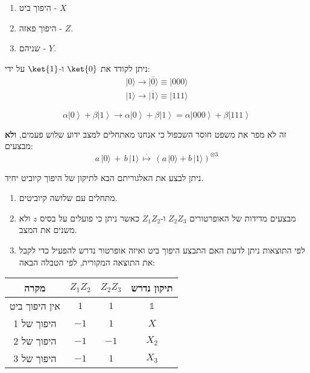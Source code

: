 \documentclass{tstextbook}
\begin{document}
\begin{proposition}
  \begin{enumerate}
    \item היפוך ביט - \(X\)


    \item היפוך פאזה - \(Z\). 


    \item שניהם - \(Y\). 


  \end{enumerate}
\end{proposition}
\begin{lemma}
ניתן לקודד את \(\ket{0}\) ו-\(\ket{1}\) על ידי:
$$\begin{array}{r}{|0\rangle\longrightarrow|\overline{{{0}}}\rangle\equiv|000\rangle}\\ {|1\rangle\longrightarrow|\overline{{{1}}}\rangle\equiv|111\rangle}\end{array}$$

\end{lemma}
\begin{corollary}
$$\alpha\left|0\right\rangle+\beta\left|1\right\rangle\longrightarrow\alpha\left|0\right\rangle+\beta\left|1\right\rangle=\alpha\left|000\right\rangle+\beta\left|111\right\rangle$$

\end{corollary}
\begin{remark}
זה לא מפר את משפט חוסר השכפול כי אנחנו מאתחלים למצב ידוע שלוש פעמים, \textbf{ולא} מבצעים:
$$a\,|0\rangle\,+\,b\,|1\rangle\,\stackrel{.}{\mapsto}\,\left(a\,|0\rangle+b\,|1\rangle\right)^{\otimes3}$$

\end{remark}
\begin{proposition}
ניתן לבצע את האלגוריתם הבא לתיקון של היפוך קיוביט יחיד.

  \begin{enumerate}
    \item מתחלים עם שלושה קיוביטים. 


    \item מבצעים מדידות של האופרטורים \(Z_{2}Z_{3}\) ו-\(Z_{1}Z_{2}\) כאשר ניתן כי פועלים על בסיס \(z\) ולא משנים את המצב. 


    \item לפי התוצאות ניתן לדעת האם התבצע היפוך ביט ואיזה אופרטור נדרש להפעיל כדי לקבל את התוצאה המקורית, לפי הטבלה הבאה: 


  \end{enumerate}
  \begin{table}[htbp]
    \centering
    \begin{tabular}{|cccc|}
      \hline
      מקרה & \(Z_1 Z_2\) & \(Z_2 Z_3\) & תיקון נדרש \\ \hline
      אין היפוך ביט & \(1\) & \(1\) & \(\mathbb{1}\) \\ \hline
      היפוך של 1 & \(-1\) & \(1\) & \(X\) \\ \hline
      היפוך של 2 & \(-1\) & \(-1\) & \(X_2\) \\ \hline
      היפוך של 3 & \(-1\) & \(1\) & \(X_3\) \\ \hline
    \end{tabular}
  \end{table}
\end{proposition}
\end{document}
